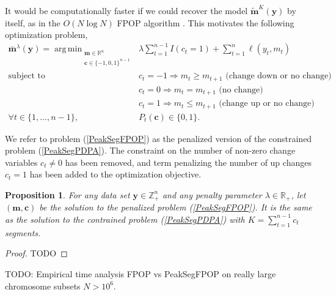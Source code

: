 \documentclass{article}
\newtheorem{proposition}{Proposition}
\DeclareMathOperator*{\argmin}{arg\,min}
\newcommand{\ZZ}{\mathbb Z}
\newcommand{\RR}{\mathbb R}
\begin{document}
It would be computationally faster if we could recover the model
$\mathbf{\tilde m}^{K}(\mathbf y)$ by itself, as in the $O(N\log N)$
FPOP algorithm \citep{johnson, FPOP}. This motivates the following
optimization problem,
\begin{align}
  \mathbf{\bar m}^\lambda(\mathbf y) =
    \argmin_{\substack{
  \mathbf m\in\RR^{n}
\\
  \mathbf c\in\{-1,0,1\}^{n-1}
  }} &\ \ 
\lambda\sum_{t=1}^{n-1} I(c_t =1)
+
\sum_{t=1}^n \ell(y_t, m_t) 
  \label{PeakSegFPOP}
\\
    \text{subject to} 
& \ \ c_t = -1 \Rightarrow m_{t} \geq m_{t+1} \text{ (change down or no change)}
\nonumber\\
& \ \ c_t = 0 \Rightarrow m_{t} = m_{t+1}  \text{ (no change)}
\nonumber\\
& \ \ c_t = 1 \Rightarrow m_{t} \leq m_{t+1} \text{ (change up or no change)}
\nonumber\\
\forall t\in\{1, \dots, n-1\}, &\ \ P_t(\mathbf c) \in\{0, 1\}.
\nonumber
\end{align}

We refer to problem (\ref{PeakSegFPOP}) as the penalized version of
the constrained problem (\ref{PeakSegPDPA}). The constraint on the
number of non-zero change variables $c_t\neq 0$ has been removed, and
term penalizing the number of up changes $c_t=1$ has been added to the
optimization objective.  

\begin{proposition}
  For any data set $\mathbf y\in\ZZ_+^n$ and any penalty parameter
  $\lambda\in\RR_+$, let $(\mathbf m,\mathbf c)$ be the solution to
  the penalized problem (\ref{PeakSegFPOP}). It is the same as the
  solution to the contrained problem (\ref{PeakSegPDPA}) with
  $K=\sum_{t=1}^{n-1} c_t$ segments.
\end{proposition}

\begin{proof}
  TODO
\end{proof}

TODO: Empirical time analysis FPOP vs PeakSegFPOP on really large
chromosome subsets $N>10^6$.
\end{document}
